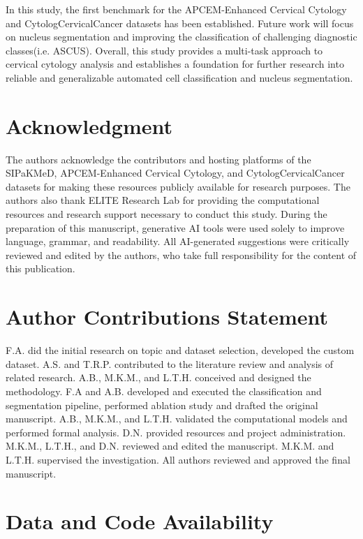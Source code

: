 \documentclass[pdflatex,sn-nature]{sn-jnl}%
\theoremstyle{thmstyleone}%
\theoremstyle{thmstyletwo}%
\theoremstyle{thmstylethree}%
\begin{document}
In this study, the first benchmark for the APCEM-Enhanced Cervical Cytology and CytologCervicalCancer datasets has been established. Future work will focus on nucleus segmentation and improving the classification of challenging diagnostic classes(i.e. ASCUS). Overall, this study provides a multi-task approach to cervical cytology analysis and establishes a foundation for further research into reliable and generalizable automated cell classification and nucleus segmentation.



\section*{Acknowledgment}

The authors acknowledge the contributors and hosting platforms of the SIPaKMeD, APCEM-Enhanced Cervical Cytology, and CytologCervicalCancer datasets for making these resources publicly available for research purposes. The authors also thank ELITE Research Lab for providing the computational resources and research support necessary to conduct this study. During the preparation of this manuscript, generative AI tools were used solely to improve language, grammar, and readability. All AI-generated suggestions were critically reviewed and edited by the authors, who take full responsibility for the content of this publication.

\section*{Author Contributions Statement}
F.A. did the initial research on topic and dataset selection, developed the custom dataset. A.S. and T.R.P. contributed to the literature review and analysis of related research. A.B., M.K.M., and L.T.H. conceived and designed the methodology. F.A and A.B. developed and executed the classification and segmentation pipeline, performed ablation study and drafted the original manuscript. A.B., M.K.M., and L.T.H. validated the computational models and performed formal analysis. D.N. provided resources and project administration. M.K.M., L.T.H., and D.N. reviewed and edited the manuscript. M.K.M. and L.T.H. supervised the investigation. All authors reviewed and approved the final manuscript.

\section*{Data and Code Availability}
\end{document}
